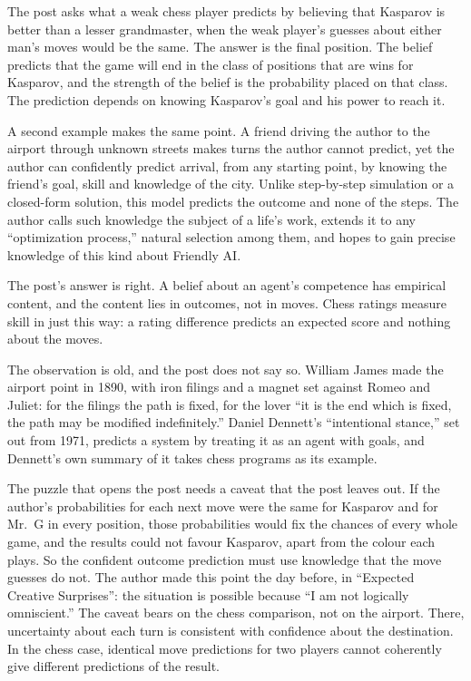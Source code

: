 \begin{afterword}
\summaryhead

The post asks what a weak chess player predicts by believing that Kasparov is better than a lesser grandmaster, when the weak player's guesses about either man's moves would be the same. The answer is the final position. The belief predicts that the game will end in the class of positions that are wins for Kasparov, and the strength of the belief is the probability placed on that class. The prediction depends on knowing Kasparov's goal and his power to reach it.

A second example makes the same point. A friend driving the author to the airport through unknown streets makes turns the author cannot predict, yet the author can confidently predict arrival, from any starting point, by knowing the friend's goal, skill and knowledge of the city. Unlike step-by-step simulation or a closed-form solution, this model predicts the outcome and none of the steps. The author calls such knowledge the subject of a life's work, extends it to any ``optimization process,'' natural selection among them, and hopes to gain precise knowledge of this kind about Friendly AI.

\responsehead

The post's answer is right. A belief about an agent's competence has empirical content, and the content lies in outcomes, not in moves. Chess ratings measure skill in just this way: a rating difference predicts an expected score and nothing about the moves.

The observation is old, and the post does not say so. William James made the airport point in 1890, with iron filings and a magnet set against Romeo and Juliet: for the filings the path is fixed, for the lover ``it is the end which is fixed, the path may be modified indefinitely.'' Daniel Dennett's ``intentional stance,'' set out from 1971, predicts a system by treating it as an agent with goals, and Dennett's own summary of it takes chess programs as its example.

The puzzle that opens the post needs a caveat that the post leaves out. If the author's probabilities for each next move were the same for Kasparov and for Mr.~G in every position, those probabilities would fix the chances of every whole game, and the results could not favour Kasparov, apart from the colour each plays. So the confident outcome prediction must use knowledge that the move guesses do not. The author made this point the day before, in ``Expected Creative Surprises'': the situation is possible because ``I am not logically omniscient.'' The caveat bears on the chess comparison, not on the airport. There, uncertainty about each turn is consistent with confidence about the destination. In the chess case, identical move predictions for two players cannot coherently give different predictions of the result.


\end{afterword}

